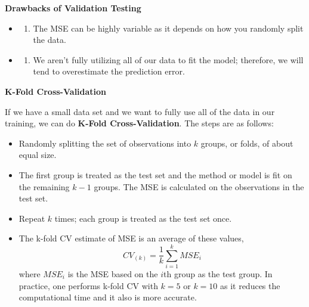 \documentclass[
]{book}
\newenvironment{Shaded}{\begin{snugshade}}{\end{snugshade}}
\newcommand{\CommentTok}[1]{\textcolor[rgb]{0.56,0.35,0.01}{\textit{#1}}}
\newcommand{\DataTypeTok}[1]{\textcolor[rgb]{0.13,0.29,0.53}{#1}}
\newcommand{\DecValTok}[1]{\textcolor[rgb]{0.00,0.00,0.81}{#1}}
\newcommand{\KeywordTok}[1]{\textcolor[rgb]{0.13,0.29,0.53}{\textbf{#1}}}
\newcommand{\NormalTok}[1]{#1}
\newcommand{\OperatorTok}[1]{\textcolor[rgb]{0.81,0.36,0.00}{\textbf{#1}}}
\newcommand{\StringTok}[1]{\textcolor[rgb]{0.31,0.60,0.02}{#1}}
\providecommand{\tightlist}{%
  \setlength{\itemsep}{0pt}\setlength{\parskip}{0pt}}
\begin{document}
\textbf{Drawbacks of Validation Testing}

\begin{itemize}
\item
  \begin{enumerate}
  \def\labelenumi{\arabic{enumi})}
  \tightlist
  \item
    The MSE can be highly variable as it depends on how you randomly split the data.
  \end{enumerate}
\item
  \begin{enumerate}
  \def\labelenumi{\arabic{enumi})}
  \setcounter{enumi}{1}
  \tightlist
  \item
    We aren't fully utilizing all of our data to fit the model; therefore, we will tend to overestimate the prediction error.
  \end{enumerate}
\end{itemize}

\textbf{K-Fold Cross-Validation}

If we have a small data set and we want to fully use all of the data in our training, we can do \textbf{K-Fold Cross-Validation}. The steps are as follows:

\begin{itemize}
\item
  Randomly splitting the set of observations into \(k\) groups, or folds, of about equal size.
\item
  The first group is treated as the test set and the method or model is fit on the remaining \(k-1\) groups. The MSE is calculated on the observations in the test set.
\item
  Repeat \(k\) times; each group is treated as the test set once.
\item
  The k-fold CV estimate of MSE is an average of these values,
  \[CV_{(k)} = \frac{1}{k}\sum^k_{i=1}MSE_i \]
  where \(MSE_i\) is the MSE based on the \(i\)th group as the test group. In practice, one performs k-fold CV with \(k=5\) or \(k=10\) as it reduces the computational time and it also is more accurate.
\end{itemize}

\begin{Shaded}
\end{Shaded}
\end{document}
